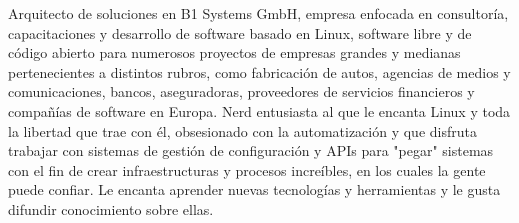 

\begin{cvparagraph}

Arquitecto de soluciones en B1 Systems GmbH, empresa enfocada en consultoría, capacitaciones y
desarrollo de software basado en Linux, software libre y de código abierto para numerosos proyectos
de empresas grandes y medianas pertenecientes a distintos rubros, como fabricación de autos,
agencias de medios y comunicaciones, bancos, aseguradoras, proveedores de servicios financieros y
compañías de software en Europa. Nerd entusiasta al que le encanta Linux y toda la libertad que trae con él, obsesionado con la automatización y que disfruta trabajar con sistemas de gestión de configuración y APIs para "pegar" sistemas con el fin de crear infraestructuras y procesos increíbles, en los cuales la gente puede confiar.
Le encanta aprender nuevas tecnologías y herramientas y le gusta difundir conocimiento sobre ellas.

\end{cvparagraph}
